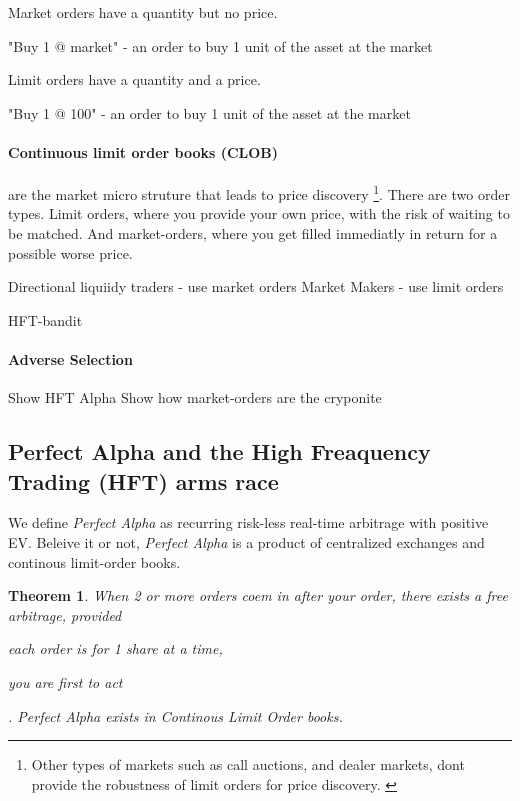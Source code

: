 \documentclass[12pt]{article}
\newtheorem{theorem}{Theorem}
\begin{document}
Market orders have a quantity but no price. 

\begin{enumerate*}
    \item "Buy 1 @ market" - an order to buy 1 unit of the asset at the market  
\end{enumerate*}

Limit orders have a quantity and a price. 

\begin{enumerate*}
    \item "Buy 1 @ 100" - an order to buy 1 unit of the asset at the market  
\end{enumerate*}



\paragraph*{Continuous limit order books (CLOB)}   are the market micro struture that leads to price discovery \footnote{Other types of markets such as call auctions, and dealer markets, dont provide the robustness of limit orders for price discovery. \cite{RePEc:hal:journl:hal-00459785}}. There are two order types. Limit orders, where you provide your own price, with the risk of waiting to be matched. And market-orders, where you get filled immediatly in return for a possible worse price.


Directional liquiidy traders - use market orders  
Market Makers - use limit orders 

HFT-bandit  

\paragraph*{Adverse Selection}

Show HFT Alpha 
Show how market-orders are the cryponite  


\subsection*{Perfect Alpha and the High Freaquency Trading (HFT) arms race}
We define \emph{Perfect Alpha} as recurring risk-less real-time arbitrage with positive EV. Beleive it or not, \emph{Perfect Alpha} is a product of centralized exchanges and continous limit-order books. 


\begin{theorem}
    When 2 or more orders coem in after your order, there exists a free arbitrage, provided  \begin {enumerate*} [1) ]%
    \item each order is for 1 share at a time, \item you are first to act \end {enumerate*}. 
    Perfect Alpha exists in Continous Limit Order books. 
\end{theorem}
\end{document}
